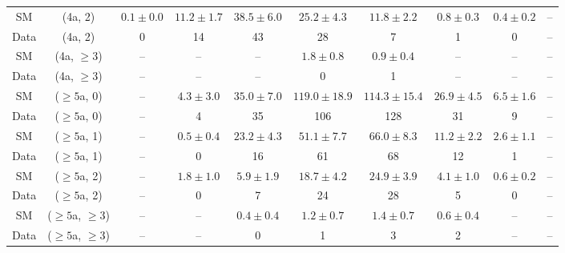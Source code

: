 \begin{table}[h!]
{\begin{tabular}{cccccccccc}
	SM & (4a, 2) & $0.1\pm 0.0$ & $11.2\pm 1.7$ & $38.5\pm 6.0$ & $25.2\pm 4.3$ & $11.8\pm 2.2$ & $0.8\pm 0.3$ & $0.4\pm 0.2$ & -- \\[0.5ex] 
	Data & (4a, 2) & 0 & 14 & 43 & 28 & 7 & 1 & 0 & -- \\[0.5ex] 
	SM & (4a, $\ge3$) & -- & -- & -- & $1.8\pm 0.8$ & $0.9\pm 0.4$ & -- & -- & -- \\[0.5ex] 
	Data & (4a, $\ge3$) & -- & -- & -- & 0 & 1 & -- & -- & -- \\[0.5ex] 
	SM & ($\ge5$a, 0) & -- & $4.3\pm 3.0$ & $35.0\pm 7.0$ & $119.0\pm 18.9$ & $114.3\pm 15.4$ & $26.9\pm 4.5$ & $6.5\pm 1.6$ & -- \\[0.5ex] 
	Data & ($\ge5$a, 0) & -- & 4 & 35 & 106 & 128 & 31 & 9 & -- \\[0.5ex] 
	SM & ($\ge5$a, 1) & -- & $0.5\pm 0.4$ & $23.2\pm 4.3$ & $51.1\pm 7.7$ & $66.0\pm 8.3$ & $11.2\pm 2.2$ & $2.6\pm 1.1$ & -- \\[0.5ex] 
	Data & ($\ge5$a, 1) & -- & 0 & 16 & 61 & 68 & 12 & 1 & -- \\[0.5ex] 
	SM & ($\ge5$a, 2) & -- & $1.8\pm 1.0$ & $5.9\pm 1.9$ & $18.7\pm 4.2$ & $24.9\pm 3.9$ & $4.1\pm 1.0$ & $0.6\pm 0.2$ & -- \\[0.5ex] 
	Data & ($\ge5$a, 2) & -- & 0 & 7 & 24 & 28 & 5 & 0 & -- \\[0.5ex] 
	SM & ($\ge5$a, $\ge3$) & -- & -- & $0.4\pm 0.4$ & $1.2\pm 0.7$ & $1.4\pm 0.7$ & $0.6\pm 0.4$ & -- & -- \\[0.5ex] 
	Data & ($\ge5$a, $\ge3$) & -- & -- & 0 & 1 & 3 & 2 & -- & -- \\[0.5ex] 
	\hline
	\hline
\end{tabular}}
\end{table}
